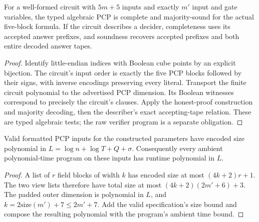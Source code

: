 \begin{lemma}
\label{lem:pcp-circuit-semantics}
\leanok
For a well-formed circuit with $5m+5$ inputs and exactly $m'$ input and gate
variables, the typed algebraic PCP is complete and majority-sound for the actual
five-block formula. If the circuit describes a decider, completeness uses its
accepted answer prefixes, and soundness recovers accepted prefixes and both
entire decoded answer tapes.
\end{lemma}
\begin{proof}
\leanok
Identify little-endian indices with Boolean cube points by an explicit bijection.
The circuit's input order is exactly the five PCP blocks followed by their signs,
with inverse encodings preserving every literal. Transport the finite circuit
polynomial to the advertised PCP dimension. Its Boolean witnesses correspond
to precisely the circuit's clauses. Apply the honest-proof construction and
majority decoding, then the describer's exact accepting-tape relation. These
are typed algebraic tests; the raw verifier program is a separate obligation.
\end{proof}

\begin{lemma}
\label{lem:pcp-view-size}
\leanok
Valid formatted PCP inputs for the constructed parameters have encoded size
polynomial in $L=\log n+\log T+Q+\sigma$. Consequently every ambient
polynomial-time program on these inputs has runtime polynomial in $L$.
\end{lemma}
\begin{proof}
\leanok
A list of $r$ field blocks of width $k$ has encoded size at most $(4k+2)r+1$.
The two view lists therefore have total size at most
$(4k+2)(2m'+6)+3$. The padded outer dimension is polynomial in $L$, and
$k=2\mathrm{size}(m')+7\leq 2m'+7$. Add the valid specification's size bound
and compose the resulting polynomial with the program's ambient time bound.
\end{proof}

